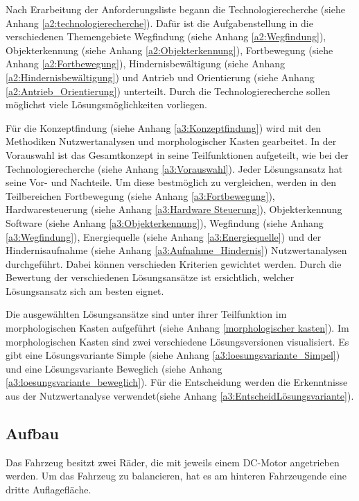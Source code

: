 \documentclass[../main.tex]{subfiles}
\begin{document}
Nach Erarbeitung der Anforderungsliste begann die Technologierecherche (siehe Anhang \ref{a2:technologierecherche}). Dafür ist die Aufgabenstellung in die verschiedenen Themengebiete Wegfindung (siehe Anhang \ref{a2:Wegfindung}), Objekterkennung (siehe Anhang \ref{a2:Objekterkennung}), Fortbewegung (siehe Anhang \ref{a2:Fortbewegung}), Hindernisbewältigung (siehe Anhang \ref{a2:Hindernisbewältigung}) und Antrieb und Orientierung (siehe Anhang \ref{a2:Antrieb_Orientierung}) unterteilt. Durch die Technologierecherche sollen möglichst viele Lösungsmöglichkeiten vorliegen. 

Für die Konzeptfindung (siehe Anhang \ref{a3:Konzeptfindung}) wird mit den Methodiken Nutzwertanalysen und morphologischer Kasten gearbeitet. In der Vorauswahl ist das Gesamtkonzept in seine Teilfunktionen aufgeteilt, wie bei der Technologierecherche (siehe Anhang \ref{a3:Vorauswahl}). Jeder Lösungsansatz hat seine Vor- und Nachteile. Um diese bestmöglich zu vergleichen, werden in den Teilbereichen Fortbewegung (siehe Anhang \ref{a3:Fortbewegung}), Hardwaresteuerung (siehe Anhang \ref{a3:Hardware Steuerung}), Objekterkennung Software (siehe Anhang \ref{a3:Objekterkennung}), Wegfindung (siehe Anhang \ref{a3:Wegfindung}), Energiequelle (siehe Anhang \ref{a3:Energiequelle}) und der Hindernisaufnahme (siehe Anhang \ref{a3:Aufnahme_Hindernis}) Nutzwertanalysen durchgeführt. Dabei können verschieden Kriterien gewichtet werden. Durch die Bewertung der verschiedenen Lösungsansätze ist ersichtlich, welcher Lösungsansatz sich am besten eignet.

Die ausgewählten Lösungsansätze sind unter ihrer Teilfunktion im morphologischen Kasten aufgeführt (siehe Anhang \ref{morphologischer kasten}). Im morphologischen Kasten sind zwei verschiedene Lösungsversionen visualisiert. Es gibt eine Lösungsvariante Simple (siehe Anhang \ref{a3:loesungsvariante_Simpel}) und eine Lösungsvariante Beweglich (siehe Anhang \ref{a3:loesungsvariante_beweglich}). Für die Entscheidung werden die Erkenntnisse aus der Nutzwertanalyse verwendet(siehe Anhang \ref{a3:EntscheidLösungsvariante}).
\newpage

\subsection{Aufbau}

Das Fahrzeug besitzt zwei Räder, die mit jeweils einem DC-Motor angetrieben werden. Um das Fahrzeug zu balancieren, hat es am hinteren Fahrzeugende eine dritte Auflagefläche.
\end{document}

